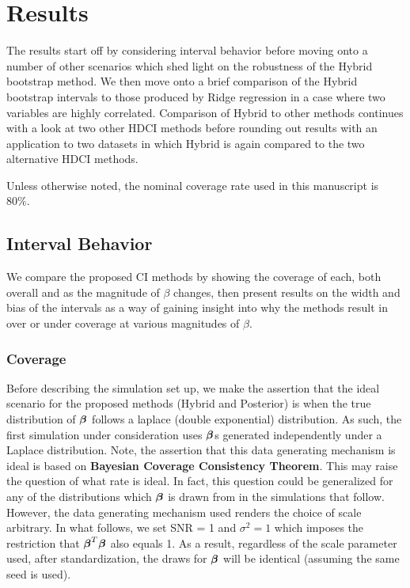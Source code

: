

\section{Results}

The results start off by considering interval behavior before moving onto a number of other scenarios which shed light on the robustness of the Hybrid bootstrap method. We then move onto a brief comparison of the Hybrid bootstrap intervals to those produced by Ridge regression in a case where two variables are highly correlated. Comparison of Hybrid to other methods continues with a look at two other HDCI methods before rounding out results with an application to two datasets in which Hybrid is again compared to the two alternative HDCI methods.

Unless otherwise noted, the nominal coverage rate used in this manuscript is 80\%.

\subsection{Interval Behavior}

We compare the proposed CI methods by showing the coverage of each, both overall and as the magnitude of $\beta$ changes, then present results on the width and bias of the intervals as a way of gaining insight into why the methods result in over or under coverage at various magnitudes of $\beta$.

\subsubsection{Coverage}\label{Sec:Coverage}

Before describing the simulation set up, we make the assertion that the ideal scenario for the proposed methods (Hybrid and Posterior) is when the true distribution of $\boldsymbol{\beta}$ follows a laplace (double exponential) distribution. As such, the first simulation under consideration uses $\boldsymbol{\beta}$s generated independently under a Laplace distribution. Note, the assertion that this data generating mechanism is ideal is based on \textbf{Bayesian Coverage Consistency Theorem}. This may raise the question of what rate is ideal. In fact, this question could be generalized for any of the distributions which $\boldsymbol{\beta}$ is drawn from in the simulations that follow. However, the data generating mechanism used renders the choice of scale arbitrary. In what follows, we set SNR = 1 and $\sigma^2 = 1$ which imposes the restriction that $\boldsymbol{\beta}^T\boldsymbol{\beta}$ also equals 1. As a result, regardless of the scale parameter used, after standardization, the draws for $\boldsymbol{\beta}$ will be identical (assuming the same seed is used).

